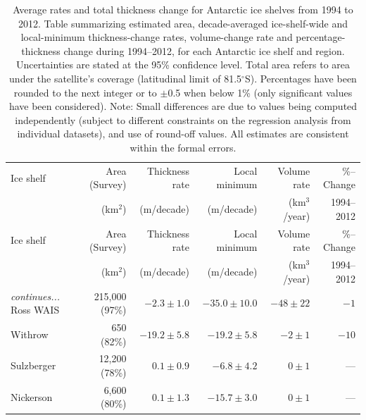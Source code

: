 \clearpage
\begin{footnotesize}
\begin{longtable}{lrrrrr}
\caption[Rates of thickness/volume change for Antarctic ice shelves]{
Average rates and total thickness change for Antarctic ice shelves from 1994 to 2012. Table summarizing estimated area, decade-averaged ice-shelf-wide and local-minimum thickness-change rates, volume-change rate and percentage-thickness change during 1994--2012, for each Antarctic ice shelf and region. Uncertainties are stated at the 95\% confidence level. Total area refers to area under the satellite's coverage (latitudinal limit of 81.5$^\circ$S). Percentages have been rounded to the next integer or to $\pm$0.5 when below 1\% (only significant values have been considered). Note: Small differences are due to values being computed independently (subject to different constraints on the regression analysis from individual datasets), and use of round-off values. All estimates are consistent within the formal errors.
} \\
\hline
Ice shelf       & Area (Survey)    & Thickness rate  & Local minimum    & Volume rate   & \%--Change \\
                & (km$^2$)         & (m/decade)      & (m/decade)       & (km$^3$/year) & 1994--2012 \\
\hline
\endfirsthead   %
\hline
Ice shelf       & Area (Survey)    & Thickness rate  & Local minimum    & Volume rate   & \%--Change \\
                & (km$^2$)         & (m/decade)      & (m/decade)       & (km$^3$/year) & 1994--2012 \\
\hline
\endhead        %
\hline
{\it continues...}
\endfoot        %
\hline
\endlastfoot    %
%
Ross WAIS       & 215,000   (97\%) & $-2.3  \pm 1.0$ & $-35.0 \pm 10.0$ & $-48  \pm 22$ & $-1  $ \\
Withrow 	& 650       (82\%) & $-19.2 \pm 5.8$ & $-19.2 \pm 5.8 $ & $-2   \pm 1 $ & $-10 $ \\
Sulzberger 	& 12,200    (78\%) & $0.1   \pm 0.9$ & $-6.8  \pm 4.2 $ & $0    \pm 1 $ &  ---   \\
Nickerson 	& 6,600     (80\%) & $0.1   \pm 1.3$ & $-15.7 \pm 3.0 $ & $0    \pm 1 $ &  ---   \\

\end{longtable}
\end{footnotesize}
